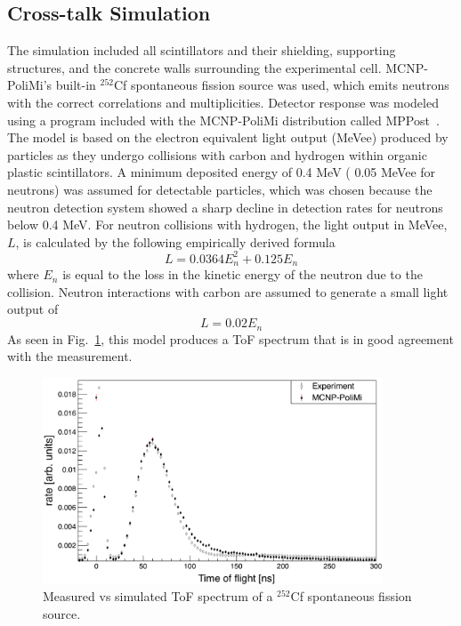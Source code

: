 \subsection{Cross-talk Simulation}
The simulation included all scintillators and their shielding, supporting structures, and the concrete walls surrounding the experimental cell.
MCNP-PoliMi's built-in $^{252}$Cf spontaneous fission source was used, which emits neutrons with the correct correlations and multiplicities.
Detector response was modeled using a program included with the MCNP-PoliMi distribution called MPPost~\cite{MPPost}.
The model is based on the electron equivalent light output (MeVee) produced by particles as they undergo collisions with carbon and hydrogen within organic plastic scintillators.
A minimum deposited energy of 0.4 MeV ( 0.05 MeVee for neutrons) was assumed for detectable particles, which was chosen because the neutron detection system showed a sharp decline in detection rates for neutrons below 0.4 MeV.
For neutron collisions with hydrogen, the light output in MeVee, $L$, is calculated by the following empirically derived formula
\begin{displaymath}
L = 0.0364 E_n^2 +  0.125 E_n
\end{displaymath}
where $E_n$ is equal to the loss in the kinetic energy of the neutron due to the collision.
Neutron interactions with carbon are assumed to generate a small light output of
\begin{displaymath}
L = 0.02 E_n
\end{displaymath}
As seen in Fig.~\ref{fig:Cf252MCNPVsEXP}, this model produces a ToF spectrum that is in good agreement with the measurement.
\begin{figure}
    \centering
    \includegraphics[width = 0.9\textwidth]{Content/Errors/Cf252MCNPVsEXP.png}
    \caption{Measured vs simulated ToF spectrum of a $^{252}$Cf spontaneous fission source.}
    \label{fig:Cf252MCNPVsEXP}
\end{figure}

